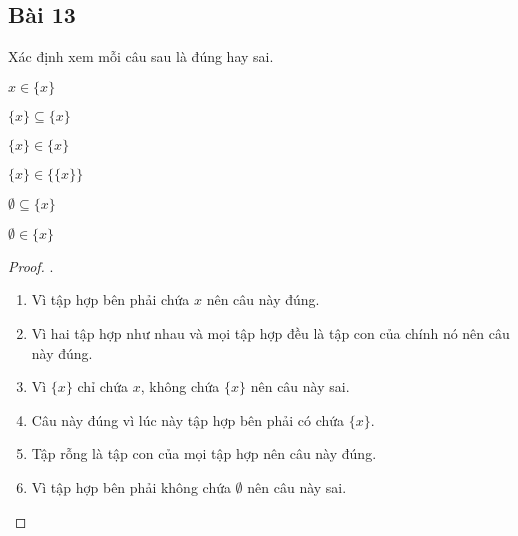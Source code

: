 \subsection*{Bài 13}
Xác định xem mỗi câu sau là đúng hay sai.
\begin{enumerate}[label=\alph*)]
    \begin{multicols}{3}
        \item $x\in\{x\}$
        \item $\{x\}\subseteq\{x\}$
        \item $\{x\}\in\{x\}$
        \item $\{x\}\in\{\{x\}\}$
        \item $\emptyset\subseteq\{x\}$
        \item $\emptyset\in\{x\}$
    \end{multicols}
\end{enumerate}
\begin{proof}.
    \begin{enumerate}[label=\alph*)]
        \item Vì tập hợp bên phải chứa $x$ nên câu này đúng.
        \item Vì hai tập hợp như nhau và mọi tập hợp đều là tập con của chính nó nên câu này đúng.
        \item Vì $\{x\}$ chỉ chứa $x$, không chứa $\{x\}$ nên câu này sai.
        \item Câu này đúng vì lúc này tập hợp bên phải có chứa $\{x\}$.
        \item Tập rỗng là tập con của mọi tập hợp nên câu này đúng.
        \item Vì tập hợp bên phải không chứa $\emptyset$ nên câu này sai.
    \end{enumerate}
\end{proof}
